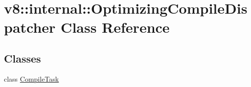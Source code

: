 \hypertarget{classv8_1_1internal_1_1OptimizingCompileDispatcher}{}\section{v8\+:\+:internal\+:\+:Optimizing\+Compile\+Dispatcher Class Reference}
\label{classv8_1_1internal_1_1OptimizingCompileDispatcher}
\subsection*{Classes}
\begin{DoxyCompactItemize}
\item 
class \mbox{\hyperlink{classv8_1_1internal_1_1OptimizingCompileDispatcher_1_1CompileTask}{Compile\+Task}}
\end{DoxyCompactItemize}
